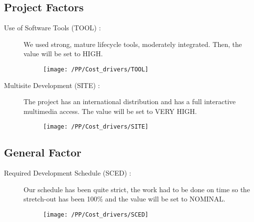 \subsection{Project Factors}
\begin{description}
    \item [Use of Software Tools (TOOL) :] We used strong, mature lifecycle tools, moderately integrated. Then, the value will be set to HIGH.
     \begin{figure}[!ht]
      \centering
      \vspace{0.2cm}
      \texttt{[image: /PP/Cost\_drivers/TOOL]}\\
      \vspace{0.2cm}
      \label{fig:TOOL} 
    \end{figure}  
    \item [Multisite Development (SITE) :] The project has an international distribution and has a full interactive multimedia access. The value will be set to VERY HIGH. 
     \begin{figure}[!ht]
      \centering
      \vspace{0.2cm}
      \texttt{[image: /PP/Cost\_drivers/SITE]}\\
      \vspace{0.2cm}
      \label{fig:SITE} 
    \end{figure}  
\end{description}

\newpage
\subsection{General Factor}
\begin{description}
    \item [Required Development Schedule (SCED) :] Our schedule has been quite strict, the work had to be done on time so the stretch-out has been 100\% and the value will be set to NOMINAL.
    \begin{figure}[!ht]
      \centering
      \vspace{0.2cm}
      \texttt{[image: /PP/Cost\_drivers/SCED]}\\
      \vspace{0.2cm}
      \label{fig:SCED} 
    \end{figure}
\end{description}


